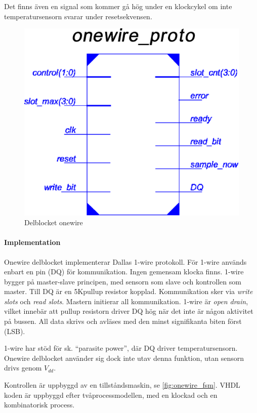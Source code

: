 \documentclass[a4paper]{scrreprt}
\begin{document}
Det finns även en  signal som kommer gå hög under en klockcykel om inte temperatursensorn svarar under resetsekvensen.
\begin{figure}[H]
	\centering
	\includegraphics[scale=0.5]{onewire_sch.eps}
	\caption{Delblocket onewire}
\end{figure}

\paragraph{Implementation}
Onewire delblocket implementerar Dallas 1-wire protokoll. För 1-wire används enbart en pin (DQ) för kommunikation. Ingen gemensam klocka finns. 1-wire bygger på master-slave principen, med sensorn som slave och kontrollen som master. Till DQ är en 5K\ohm pullup resistor kopplad. Kommunikation sker via \emph{write slots} och \emph{read slots}. Mastern initierar all kommunikation. 1-wire är \emph{open drain}, vilket innebär att pullup resistorn driver DQ hög när det inte är någon aktivitet på bussen. All data skrivs och avläses med den minst signifikanta biten först (LSB).

1-wire har stöd för sk. ``parasite power'', där DQ driver temperatursensorn. Onewire delblocket använder sig dock inte utav denna funktion, utan sensorn drivs genom $V_{dd}$.

Kontrollen är uppbyggd av en tillståndsmaskin, se \autoref{fig:onewire_fsm}. VHDL koden är uppbyggd efter tvåprocessmodellen, med en klockad och en kombinatorisk process.
\end{document}
